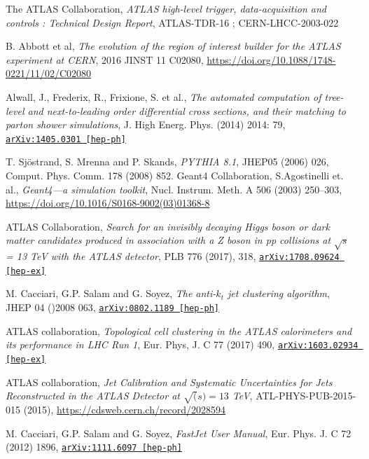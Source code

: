 \documentclass[11pt,a4paper,openright,twoside]{report}
\newcommand{\bibref}[4]{#1, \textit{#2}, #3 #4}
\begin{document}
\begin{thebibliography}{9}
	\bibref{The ATLAS Collaboration}{ATLAS high-level trigger, data-acquisition and controls : Technical Design Report}{ATLAS-TDR-16 ;}{CERN-LHCC-2003-022}

	\bibref{B. Abbott et al}{The evolution of the region of interest builder for the ATLAS experiment at CERN}{2016 JINST 11 C02080,}{\url{https://doi.org/10.1088/1748-0221/11/02/C02080}}

	\bibref{Alwall, J., Frederix, R., Frixione, S. et al.}{The automated computation of tree-level and next-to-leading order differential cross sections, and their matching to parton shower simulations}{J. High Energ. Phys. (2014) 2014: 79,}{\href{https://arxiv.org/abs/1405.0301}{\texttt{arXiv:1405.0301 [hep-ph]}}}

	\bibref{T. Sjöstrand, S. Mrenna and P. Skands}{PYTHIA 8.1}{JHEP05 (2006) 026, Comput. Phys. Comm. 178 (2008) 852.}

	\bibref{Geant4 Collaboration, S.Agostinelli et. al.}{Geant4—a simulation toolkit}{Nucl. Instrum. Meth. A 506 (2003) 250–303,}{\url{https://doi.org/10.1016/S0168-9002(03)01368-8}}

	\bibref{ATLAS Collaboration}{Search for an invisibly decaying Higgs boson or dark matter candidates produced in association with a Z boson in pp collisions at $\sqrt{s}$ = 13 TeV with the ATLAS detector}{PLB 776 (2017), 318,}{\href{https://arxiv.org/abs/1708.09624}{\texttt{arXiv:1708.09624 [hep-ex]}}}
	
	\bibref{M. Cacciari, G.P. Salam and G. Soyez}{The anti-$k_t$ jet clustering algorithm}{JHEP 04 ()2008 063,}{\href{https://arxiv.org/abs/0802.1189}{\texttt{arXiv:0802.1189 [hep-ph]}}}
	
	\bibref{ATLAS collaboration}{Topological cell clustering in the ATLAS calorimeters and its performance in LHC Run 1}{Eur. Phys, J. C 77 (2017) 490,}{\href{https://arxiv.org/abs/1603.02934}{\texttt{arXiv:1603.02934 [hep-ex]}}}
	
	\bibref{ATLAS collaboration}{Jet Calibration and Systematic Uncertainties for Jets Reconstructed in the ATLAS Detector at $\sqrt(s)=13$ TeV}{ATL-PHYS-PUB-2015-015 (2015),}{\url{https://cdsweb.cern.ch/record/2028594}}
	
	\bibref{M. Cacciari, G.P. Salam and G. Soyez}{FastJet User Manual}{Eur. Phys. J. C 72 (2012) 1896,}{\href{https://arxiv.org/abs/1111.6097}{\texttt{arXiv:1111.6097 [hep-ph]}}}
	

\end{thebibliography}
\end{document}
